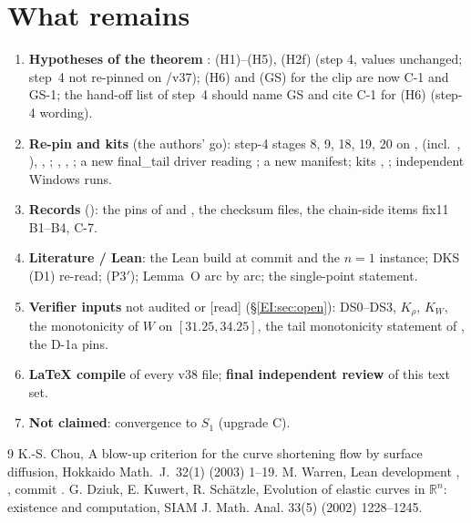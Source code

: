 \documentclass[11pt]{article}
\begin{document}
\section{What remains}\label{M:sec:remains}
\begin{enumerate}[leftmargin=*]
\item \textbf{Hypotheses of the theorem} \tH: (H1)--(H5), (H2f) (step 4, values unchanged; step~4 not re-pinned on /v37); (H6) and (GS) for the clip are now C-1 and GS-1; the hand-off list of step~4 should name GS and cite C-1 for (H6) (step-4 wording).
\item \textbf{Re-pin and kits} (the authors' go): step-4 stages 8, 9, 18, 19, 20 on ,  (incl.\ , ), , ; , , ; a new final\_tail driver reading ; a new manifest; kits , ; independent Windows runs.
\item \textbf{Records} (): the pins of  and , the checksum files, the chain-side items fix11 B1--B4, C-7.
\item \textbf{Literature / Lean}: the Lean build at commit  and the $n=1$ instance; DKS (D1) re-read; (P3$'$); Lemma~O arc by arc; the single-point statement.
\item \textbf{Verifier inputs} not audited or [read] (\S\ref{EI:sec:open}): DS0--DS3, $K_\rho$, $K_W$, the monotonicity of $W$ on $[31.25,34.25]$, the tail monotonicity statement of , the D-1a pins.
\item \textbf{LaTeX compile} of every v38 file; \textbf{final independent review} of this text set.
\item \textbf{Not claimed}: convergence to $S_1$ (upgrade C).
\end{enumerate}

\begin{thebibliography}{9}
 K.-S. Chou, A blow-up criterion for the curve shortening flow by surface diffusion, Hokkaido Math.\ J.\ 32(1) (2003) 1--19.
 M. Warren, Lean development , , commit .
 G. Dziuk, E. Kuwert, R. Sch{\"a}tzle, Evolution of elastic curves in $\mathbb R^n$: existence and computation, SIAM J. Math. Anal. 33(5) (2002) 1228--1245.
\end{thebibliography}
\end{document}

